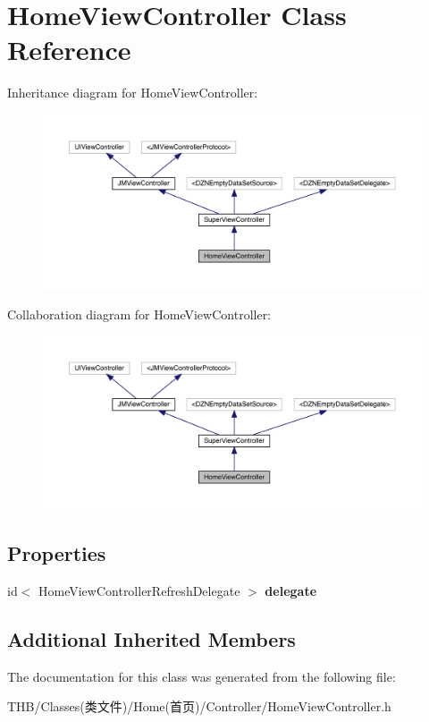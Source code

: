 \hypertarget{interface_home_view_controller}{}\section{Home\+View\+Controller Class Reference}
\label{interface_home_view_controller}


Inheritance diagram for Home\+View\+Controller\+:\nopagebreak
\begin{figure}[H]
\begin{center}
\leavevmode
\includegraphics[width=350pt]{interface_home_view_controller__inherit__graph}
\end{center}
\end{figure}


Collaboration diagram for Home\+View\+Controller\+:\nopagebreak
\begin{figure}[H]
\begin{center}
\leavevmode
\includegraphics[width=350pt]{interface_home_view_controller__coll__graph}
\end{center}
\end{figure}
\subsection*{Properties}
\begin{DoxyCompactItemize}
\item 
\mbox{\label{interface_home_view_controller_abedc35e2a7fd8d946dc6469500a9bcc6}} 
id$<$ Home\+View\+Controller\+Refresh\+Delegate $>$ {\bfseries delegate}
\end{DoxyCompactItemize}
\subsection*{Additional Inherited Members}


The documentation for this class was generated from the following file\+:\begin{DoxyCompactItemize}
\item 
T\+H\+B/\+Classes(类文件)/\+Home(首页)/\+Controller/Home\+View\+Controller.\+h\end{DoxyCompactItemize}
